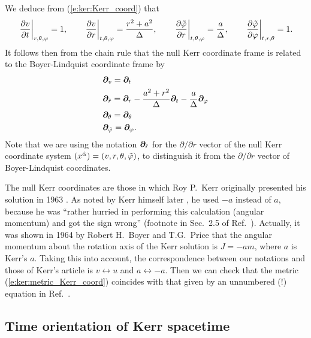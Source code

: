 We deduce from (\ref{e:ker:Kerr_coord}) that
\[
    \left. \frac{\partial v}{\partial t} \right| _{r,\theta,\varphi} = 1, \qquad
    \left. \frac{\partial v}{\partial r} \right| _{t,\theta,\varphi} = \frac{r^2 + a^2}{\Delta},\qquad
    \left. \frac{\partial {\tilde\varphi}}{\partial r} \right| _{t,\theta,\varphi} = \frac{a}{\Delta},\qquad
    \left. \frac{\partial {\tilde\varphi}}{\partial \varphi} \right| _{t,r,\theta} = 1.
\]
It follows then from the chain rule that
the null Kerr coordinate frame
is related to the Boyer-Lindquist coordinate frame by
\begin{subequations}
\label{e:ker:frame_Kerr_BL}
\begin{align}
    & \bm{\partial}_v = \bm{\partial}_t \\
    & \bm{\partial}_{\hat{r}} = \bm{\partial}_r - \frac{a^2+r^2}{\Delta} \bm{\partial}_t
                        - \frac{a}{\Delta} \bm{\partial}_\varphi \label{e:ker:frame_Kerr_BL_r}\\
    & \bm{\partial}_\theta = \bm{\partial}_\theta \\
    & \bm{\partial}_{{\tilde\varphi}} = \bm{\partial}_\varphi .
\end{align}
\end{subequations}
Note that we are using the notation $\bm{\partial}_{\hat{r}}$ for the $\partial/\partial r$
vector of the null Kerr coordinate system $(x^{\hat{\alpha}}) = (v,r,\theta,{\tilde\varphi})$, to distinguish
it from the $\partial/\partial r$ vector of Boyer-Lindquist coordinates.

\begin{hist} \label{h:ker:Kerr_coord}
The null Kerr coordinates are those in which Roy P.~Kerr originally presented his
solution in 1963 \cite{Kerr63}. As noted by Kerr himself later \cite{Kerr09}, he used $-a$ instead of $a$,
because he was ``rather hurried in performing
this calculation (angular momentum) and got the sign wrong'' (footnote in Sec.~2.5 of
Ref.~\cite{Kerr09}).
Actually, it was shown in 1964
by Robert H.~Boyer and
T.G.~Price \cite{BoyerP65}
that the angular momentum about the rotation axis of the Kerr solution is $J=- a m$,
where $a$ is Kerr's $a$.
Taking this into account, the correspondence between our notations and those of Kerr's article \cite{Kerr63}
is $v\leftrightarrow u$ and $a\leftrightarrow -a$. Then we can check that
the metric (\ref{e:ker:metric_Kerr_coord}) coincides with that given
by an unnumbered (!) equation in Ref.~\cite{Kerr63}.
\end{hist}

\subsection{Time orientation of Kerr spacetime} \label{s:ker:time_orientation}

